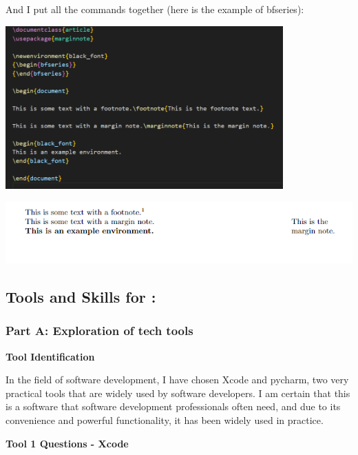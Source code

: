 \documentclass[a4paper, 11pt]{report}
\begin{document}
And I put all the commands together (here is the example of bfseries):

\begin{center}
\includegraphics[width=0.8\textwidth, keepaspectratio]{ZIXI_MAI_example.png}
\end{center}

\begin{center}
\includegraphics[width=1.0\textwidth, keepaspectratio]{ZIXI_MAI_examplepdf.png}
\end{center}


\subsection{Tools and Skills for \majC: \studC}

\subsubsection{Part A: Exploration of tech tools}

\textbf{\large{Tool Identification}}

In the field of software development, I have chosen Xcode and pycharm, two very practical tools that are widely used by software developers. I am certain that this is a software that software development professionals often need, and due to its convenience and powerful functionality, it has been widely used in practice.

\vspace{\baselineskip}
\textbf{\large{Tool 1 Questions - Xcode}}
\end{document}
